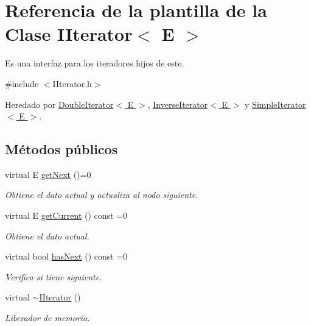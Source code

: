 \hypertarget{classIIterator}{\section{Referencia de la plantilla de la Clase I\-Iterator$<$ E $>$}
\label{classIIterator}
}


Es una interfaz para los iteradores hijos de este.  




{\ttfamily \#include $<$I\-Iterator.\-h$>$}



Heredado por \hyperlink{classDoubleIterator}{Double\-Iterator$<$ E $>$}, \hyperlink{classInverseIterator}{Inverse\-Iterator$<$ E $>$} y \hyperlink{classSimpleIterator}{Simple\-Iterator$<$ E $>$}.

\subsection*{Métodos públicos}
\begin{DoxyCompactItemize}
\item 
virtual E \hyperlink{classIIterator_ab1b13434e4fac20c74262dee51d1e870}{get\-Next} ()=0
\begin{DoxyCompactList}\small\item\em Obtiene el dato actual y actualiza al nodo siguiente. \end{DoxyCompactList}\item 
virtual E \hyperlink{classIIterator_a50f55ce1381378aad2c93f16c9b60822}{get\-Current} () const =0
\begin{DoxyCompactList}\small\item\em Obtiene el dato actual. \end{DoxyCompactList}\item 
virtual bool \hyperlink{classIIterator_a8a73f0fb41a66fe98e5e636378759196}{has\-Next} () const =0
\begin{DoxyCompactList}\small\item\em Verifica si tiene siguiente. \end{DoxyCompactList}\item 
\hypertarget{classIIterator_a46e00fa31d4f8d29232f4b1dfc27026b}{virtual \hyperlink{classIIterator_a46e00fa31d4f8d29232f4b1dfc27026b}{$\sim$\-I\-Iterator} ()}\label{classIIterator_a46e00fa31d4f8d29232f4b1dfc27026b}

\begin{DoxyCompactList}\small\item\em Liberador de memoria. \end{DoxyCompactList}\end{DoxyCompactItemize}


